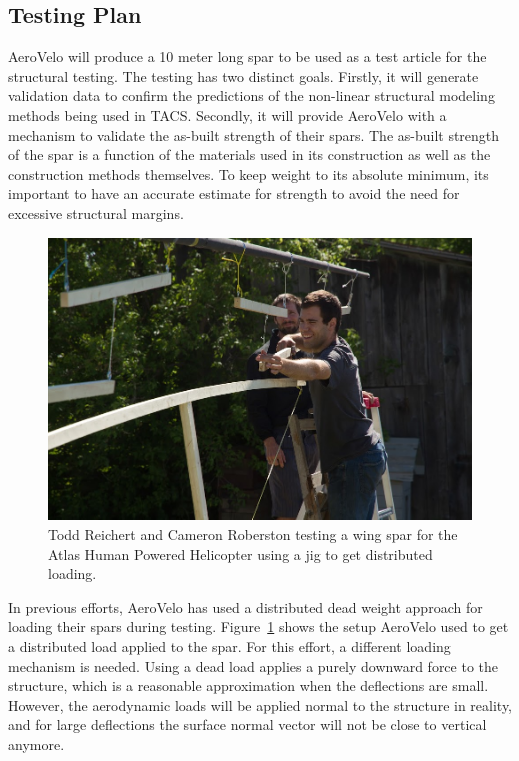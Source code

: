 \documentclass[]{aiaa-tc}
\begin{document}
        \subsection{Testing Plan}

        AeroVelo will produce a 10 meter long spar to be used as a test article for the structural testing. The testing has 
        two distinct goals. Firstly, it will generate validation data to confirm the predictions 
        of the non-linear structural modeling methods being used in TACS. Secondly, it will provide AeroVelo with a mechanism 
        to validate the as-built strength of their spars. The as-built strength of the spar is a function of the materials used 
        in its construction as well as the construction methods themselves. To keep weight to its absolute minimum, 
        its important to have an accurate estimate for strength to avoid the need for excessive structural margins. 

        \begin{figure}
            \centering
            \includegraphics[width=.5\textwidth]{images/structural_test}
            \caption{Todd Reichert and Cameron Roberston testing a wing spar for the Atlas Human Powered Helicopter using a
            jig to get distributed loading. }
            \label{fig:spar-load-test}
        \end{figure}

        In previous efforts, AeroVelo has used a distributed dead weight approach for loading their spars during testing. 
        Figure~\ref{fig:spar-load-test} shows the setup AeroVelo used to get a distributed load applied to the spar. 
        For this effort, a different loading mechanism is needed. Using a dead load applies a purely downward force to the 
        structure, which is a reasonable approximation when the deflections are small. However, the aerodynamic loads will 
        be applied normal to the structure in reality, and for large deflections the surface normal vector will not be 
        close to vertical anymore. 
\end{document}
